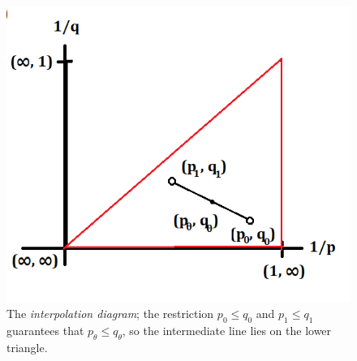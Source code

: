\documentclass[reqno]{amsart}
\theoremstyle{definition}
\theoremstyle{remark}
\begin{document}
\begin{figure}[h]
	\begin{center}
		\includegraphics[scale = 0.6]{marcin}
		\caption{The \textit{interpolation diagram}; the restriction $p_0 \leq q_0$ and $p_1 \leq q_1$ guarantees that $p_\theta \leq q_\theta$, so the intermediate line lies on the lower triangle.}
	\end{center}
\end{figure}
\end{document}
